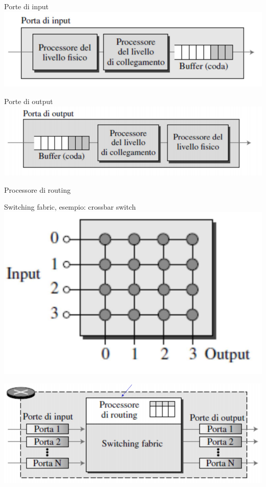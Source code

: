 \documentclass[10pt]{article}
\begin{document}
\begin{list}{}{}
\item Porte di input\\
\includegraphics[scale=0.33]{routerportain.png}
\item Porte di output\\
\includegraphics[scale=0.33]{routerportaout.png}
\item Processore di routing
\item Switching fabric, esempio: crossbar switch\\
\includegraphics[scale=0.33]{routerswitchfabric.png}
\end{list}
\begin{center}
\includegraphics[scale=0.7]{routercomponenti.png}
\end{center}
\pagebreak
\end{document}
